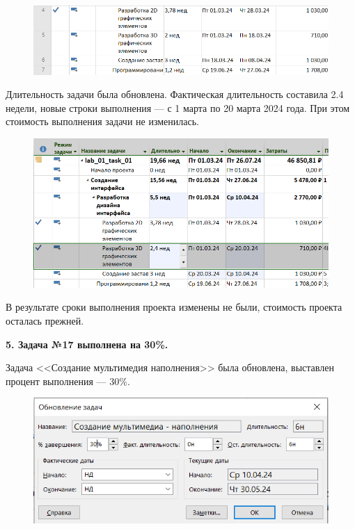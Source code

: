 \begin{figure}[h!]
	\begin{center}
		\includegraphics[scale=0.6]{inc/img/p_14.png}
	\end{center}
	\captionsetup{justification=centering}
	\label{fig:u3}
\end{figure}

Длительность задачи была обновлена. Фактическая длительность составила 2.4 недели, новые строки выполнения --- с 1 марта по 20 марта 2024 года. При этом стоимость выполнения задачи не изменилась.

\begin{figure}[h!]
	\begin{center}
		\includegraphics[scale=0.6]{inc/img/p_15.png}
	\end{center}
	\captionsetup{justification=centering}
	\label{fig:u3}
\end{figure}

В результате сроки выполнения проекта изменены не были, стоимость проекта осталась прежней.

\newpage


\textbf{5. Задача №17 выполнена на 30\%.}

Задача <<Создание мультимедия наполнения>> была обновлена, выставлен процент выполнения --- 30\%.

\begin{figure}[h!]
	\begin{center}
		\includegraphics[scale=0.6]{inc/img/p_16.png}
	\end{center}
	\captionsetup{justification=centering}
	\label{fig:u3}
\end{figure}

